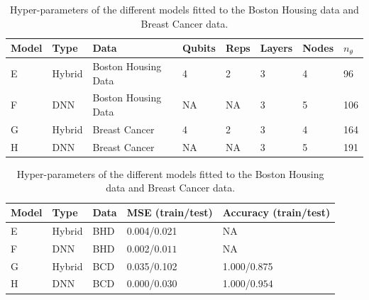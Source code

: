 \begin{table}[H]
\centering
\begin{tabular}{|l|l|l|l|l|l|l|l|}
\hline
Model& Type& Data& Qubits& Reps& Layers & Nodes &$n_{\theta}$ \\ \hline
E    & Hybrid & Boston Housing Data  & 4     & 2&3      & 4& 96   \\ \hline
F    & DNN & Boston Housing Data  & NA    & NA&3      & 5& 106 \\ \Xhline{2\arrayrulewidth}
G    & Hybrid & Breast Cancer        & 4     & 2&3      & 4& 164  \\ \hline
H    & DNN & Breast Cancer        & NA    & NA&3      & 5& 191  \\ \hline
\end{tabular}
\caption{Hyper-parameters of the different models fitted to the Boston Housing data and Breast Cancer data.} 
\label{tab:training models Hybrid}
\end{table}

%        

\begin{table}[H]
\centering
\begin{tabular}{|l|l|l|l|l|}
\hline
Model& Type& Data& MSE (train/test) & Accuracy (train/test) \\ \hline
E    & Hybrid & BHD  & 0.004/0.021 & NA    \\ \hline
F    & DNN & BHD     & 0.002/$\boldsymbol{0.011}$  & NA  \\ \Xhline{2\arrayrulewidth}
G    & Hybrid & BCD        & 0.035/0.102  & 1.000/0.875    \\ \hline
H    & DNN & BCD           & 0.000/$\boldsymbol{0.030}$  & 1.000/$\boldsymbol{0.954}$  \\ \hline
\end{tabular}
\caption{Hyper-parameters of the different models fitted to the Boston Housing data and Breast Cancer data.} 
\label{tab:results PCA}
\end{table}

